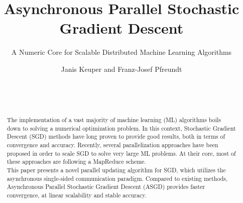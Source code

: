\documentclass{acm_proc_article-sp}
\begin{document}
\title{Asynchronous Parallel Stochastic Gradient Descent}
\subtitle{A Numeric Core for Scalable Distributed Machine Learning Algorithms}

\author{
\alignauthor
Janis Keuper and Franz-Josef Pfreundt\\\
       \\
       \\
       \\
}

\maketitle
\begin{abstract}
The implementation of a vast majority of machine learning (ML) algorithms boils down
to solving a numerical optimization problem. In this context, Stochastic 
Gradient Descent (SGD) methods have long proven to provide good results, both
in terms of convergence and accuracy. Recently, several parallelization approaches
have been proposed in order to scale SGD to solve very large ML problems. 
At their core, most of these approaches are following a MapReduce scheme.\\
This paper presents a novel parallel updating algorithm for SGD, which utilizes
the asynchronous single-sided communication paradigm.  
Compared to existing methods, Asynchronous Parallel Stochastic Gradient Descent
(ASGD) provides faster convergence, 
at linear scalability and stable accuracy.   
\end{abstract}
\end{document}

